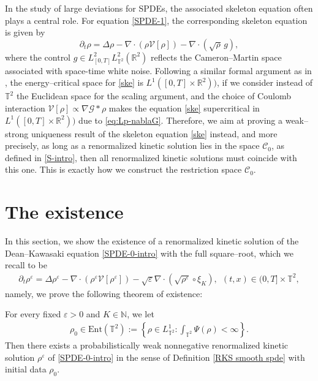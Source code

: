 In the study of large deviations for SPDEs, the associated skeleton equation often plays a central role. For equation \eqref{SPDE-1}, the corresponding skeleton equation is given by
\begin{equation}\label{ske}
\partial_t \rho = \Delta \rho - \nabla \cdot (\rho \mathcal{V}[\rho]) - \nabla \cdot \left( \sqrt{\rho}\, g \right),
\end{equation}
where the control $g \in L^2_{[0,T]}L^2_{\mathbb{T}^2}(\mathbb{R}^2)$ reflects the Cameron--Martin space associated with space-time white noise. Following a similar formal argument as in \cite{FG23}, the energy--critical space for \eqref{ske} is $L^1([0,T] \times \mathbb{R}^2))$, if we consider instead of $\mathbb{T}^2$ the Euclidean space for the scaling argument, and the choice of Coulomb interaction $\mathcal{V}[\rho] \propto \nabla \mathcal{G} \ast \rho$ makes the equation \eqref{ske} supercritical in $L^1([0,T] \times \mathbb{R}^2))$ due to \eqref{eq:Lp-nablaG}. Therefore, we aim at proving a weak--strong uniqueness result of the skeleton equation \eqref{ske} instead, and more precisely, as long as a renormalized kinetic solution lies in the space $\mathcal{C}_0$, as defined in \eqref{S-intro}, then all renormalized kinetic solutions must coincide with this one. This is exactly how we construct the restriction space $\mathcal{C}_0$.

\section{The existence}\label{sec:existence}
In this section, we show the existence of a renormalized kinetic solution of the Dean--Kawasaki equation \eqref{SPDE-0-intro} with the full square--root, which we recall to be 
\begin{align*}
\partial_t\rho^{\varepsilon}=\Delta\rho^{\varepsilon}-\nabla\cdot\left(\rho^{\varepsilon}\mathcal{V}[\rho^{\varepsilon}]\right) - \sqrt{\varepsilon}\nabla\cdot(\sqrt{\rho^{\varepsilon}}\circ\xi_{K}), 	\ \ (t,x)\in(0,T]\times\mathbb{T}^2, 
\end{align*}
namely, we prove the following theorem of existence: 
\begin{thm}\label{spde WP}
  For every fixed $\varepsilon > 0$ and $K \in \mathbb{N}$, we let 
 \begin{align}\label{eq:def-Ent}
 \rho_0 \in \mathrm{Ent}(\mathbb{T}^2) := \left\{\rho \in L^1_{\mathbb{T}^2}: \int_{\mathbb{T}^2} \Psi(\rho) < \infty \right\}.
\end{align} 
Then there exists a probabilistically weak nonnegative renormalized kinetic solution $\rho^{\varepsilon}$ of \eqref{SPDE-0-intro} in the sense of Definition \ref{RKS smooth spde} with initial data $\rho_0$.
\end{thm}

